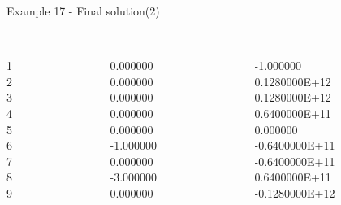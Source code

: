 \begin{frame}{Example 17 - Final solution(2)}
\footnotesize

\begin{columns}[t]
\begin{column}{0.3\textwidth}
\\
1\\
2\\
3\\
4\\
5\\
6\\
7\\
8\\
9\\
\end{column}
\begin{column}{0.3\textwidth}
\\
0.000000\\
0.000000\\
0.000000\\
0.000000\\
0.000000\\
-1.000000\\
0.000000\\
-3.000000\\
0.000000\\
\end{column}  

\begin{column}{0.3\textwidth}
\\
-1.000000\\
0.1280000E+12\\
0.1280000E+12\\
0.6400000E+11\\
0.000000\\
-0.6400000E+11\\
-0.6400000E+11\\
0.6400000E+11\\
-0.1280000E+12\\
\end{column}
\end{columns}
\end{frame}

